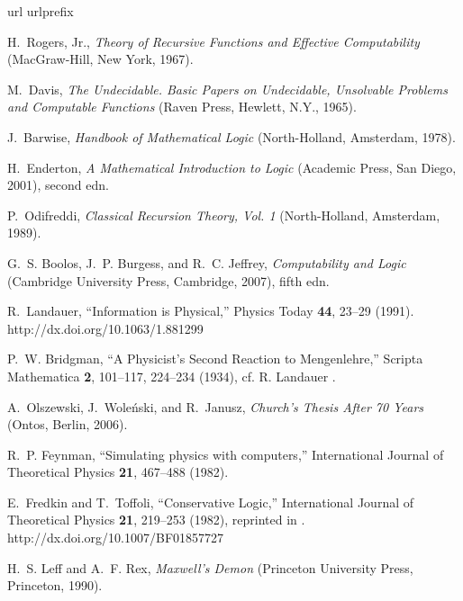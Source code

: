 \documentclass[prl,amsfonts,amsmath,showpacs,showkeys,preprint]{revtex4}
\begin{document}
\begin{thebibliography}{10}
\newcommand{\enquote}[1]{``#1''}
\expandafter\ifx\csname url\endcsname\relax
  \def\url#1{{#1}}\fi
\expandafter\ifx\csname urlprefix\endcsname\relax\def\urlprefix{}\fi

H.~{Rogers, Jr.}, {\em Theory of Recursive Functions and Effective
  Computability\/} (MacGraw-Hill, New York, 1967).

M.~Davis, {\em The Undecidable. Basic Papers on Undecidable, Unsolvable
  Problems and Computable Functions\/} (Raven Press, Hewlett, N.Y., 1965).

J.~Barwise, {\em Handbook of Mathematical Logic\/} (North-Holland, Amsterdam,
  1978).

H.~Enderton, {\em {A Mathematical Introduction to Logic}\/} ({Academic Press},
  San Diego, 2001), second edn.

P.~Odifreddi, {\em Classical Recursion Theory, Vol. 1\/} (North-Holland,
  Amsterdam, 1989).

G.~S. Boolos, J.~P. Burgess, and R.~C. Jeffrey, {\em Computability and Logic\/}
  (Cambridge University Press, Cambridge, 2007), fifth edn.

R.~Landauer, \enquote{Information is Physical,} Physics Today {\bf 44}, 23--29
  (1991).
\newline http://dx.doi.org/10.1063/1.881299

P.~W. Bridgman, \enquote{A Physicist's Second Reaction to {M}engenlehre,}
  Scripta Mathematica {\bf 2}, 101--117, 224--234 (1934), cf. R. Landauer
  \cite{landauer-95}.

A.~Olszewski, J.~Wole{\'{n}}ski, and R.~Janusz, {\em {C}hurch's Thesis After 70
  Years\/} (Ontos, Berlin, 2006).

R.~P. Feynman, \enquote{Simulating physics with computers,} International
  Journal of Theoretical Physics {\bf 21}, 467--488 (1982).

E.~Fredkin and T.~Toffoli, \enquote{Conservative Logic,} International Journal
  of Theoretical Physics {\bf 21}, 219--253 (1982), reprinted in \cite[Part I,
  Chapter 3]{adama02}.
\newline http://dx.doi.org/10.1007/BF01857727

H.~S. Leff and A.~F. Rex, {\em Maxwell's Demon\/} (Princeton University Press,
  Princeton, 1990).


\end{thebibliography}
\end{document}
